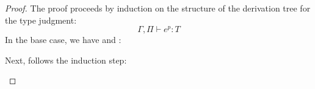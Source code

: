 \documentclass[../../../master.tex]{subfiles}
\begin{document}
\begin{proof}
	The proof proceeds by induction on the structure of the derivation tree for the type judgment:
	$$\Gamma,\Pi\vdash e^{p}:T$$
	In the base case, we have  and :
	\begin{description}
		
		
	\end{description}

	Next, follows the induction step:
	\begin{description}
		
		
		
		
		
		
		
		
		
		
	\end{description}
\end{proof}
\end{document}
